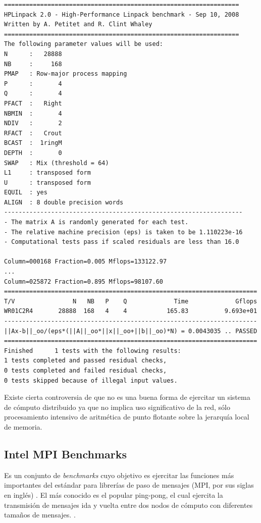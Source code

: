 \documentclass[a4paper]{report}
\begin{document}
{\small
\begin{verbatim}
=================================================================
HPLinpack 2.0 - High-Performance Linpack benchmark - Sep 10, 2008
Written by A. Petitet and R. Clint Whaley
=================================================================
The following parameter values will be used:
N      :   28888
NB     :     168
PMAP   : Row-major process mapping
P      :       4
Q      :       4
PFACT  :   Right
NBMIN  :       4
NDIV   :       2
RFACT  :   Crout
BCAST  :  1ringM
DEPTH  :       0
SWAP   : Mix (threshold = 64)
L1     : transposed form
U      : transposed form
EQUIL  : yes
ALIGN  : 8 double precision words
------------------------------------------------------------------
- The matrix A is randomly generated for each test.
- The relative machine precision (eps) is taken to be 1.110223e-16
- Computational tests pass if scaled residuals are less than 16.0

Column=000168 Fraction=0.005 Mflops=133122.97
...
Column=025872 Fraction=0.895 Mflops=98107.60
======================================================================
T/V                N   NB   P    Q             Time             Gflops
WR01C2R4       28888  168   4    4           165.83          9.693e+01
----------------------------------------------------------------------
||Ax-b||_oo/(eps*(||A||_oo*||x||_oo+||b||_oo)*N) = 0.0043035 .. PASSED
======================================================================
Finished      1 tests with the following results:
1 tests completed and passed residual checks,
0 tests completed and failed residual checks,
0 tests skipped because of illegal input values.
\end{verbatim}
}

\bigskip

Existe cierta controversia de que no es una buena forma de ejercitar un
sistema de cómputo distribuido ya que no implica uso significativo de la
red, sólo procesamiento intensivo de aritmética de punto flotante
sobre la jerarquía local de memoria.

\subsection{Intel MPI Benchmarks}

Es un conjunto de {\it benchmarks} cuyo objetivo es ejercitar las funciones
más importantes del estándar para librerías de paso de mensajes (MPI, por sus siglas en inglés) \cite{mpi-standard}.
El más conocido es el popular ping-pong, el cual ejercita la transmisión de mensajes ida y vuelta entre dos nodos de
cómputo con diferentes tamaños de mensajes. \cite{latency}.
\end{document}

